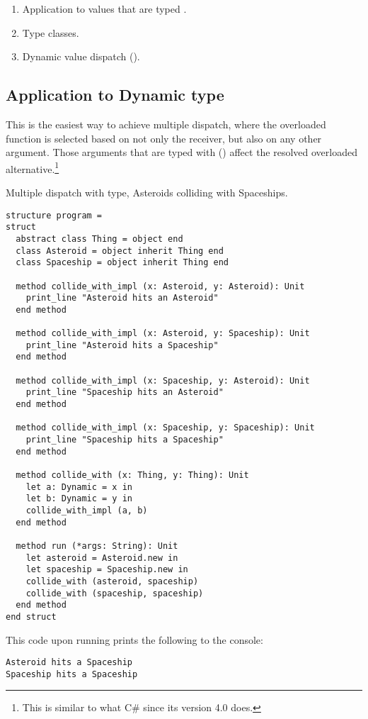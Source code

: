 \begin{enumerate}
  \item Application to values that are typed .
  \item Type classes. 
  \item Dynamic value dispatch (). 
\end{enumerate}




\subsection{Application to Dynamic type}

This is the easiest way to achieve multiple dispatch, where the overloaded function is selected based on not only the receiver, but also on any other argument. Those arguments that are typed with  () affect the resolved overloaded alternative.\footnote{This is similar to what C\# since its version 4.0 does.}

\example Multiple dispatch with  type, Asteroids colliding with Spaceships.  
\begin{lstlisting}[morekeywords={Dynamic}]
structure program =
struct
  abstract class Thing = object end
  class Asteroid = object inherit Thing end
  class Spaceship = object inherit Thing end
  
  method collide_with_impl (x: Asteroid, y: Asteroid): Unit
    print_line "Asteroid hits an Asteroid"
  end method
  
  method collide_with_impl (x: Asteroid, y: Spaceship): Unit
    print_line "Asteroid hits a Spaceship"
  end method
  
  method collide_with_impl (x: Spaceship, y: Asteroid): Unit
    print_line "Spaceship hits an Asteroid"
  end method
  
  method collide_with_impl (x: Spaceship, y: Spaceship): Unit
    print_line "Spaceship hits a Spaceship"
  end method
  
  method collide_with (x: Thing, y: Thing): Unit
    let a: Dynamic = x in
    let b: Dynamic = y in
    collide_with_impl (a, b)
  end method
  
  method run (*args: String): Unit
    let asteroid = Asteroid.new in
    let spaceship = Spaceship.new in
    collide_with (asteroid, spaceship)
    collide_with (spaceship, spaceship)
  end method
end struct
\end{lstlisting}
This code upon running  prints the following to the console:
\begin{lstlisting}
Asteroid hits a Spaceship
Spaceship hits a Spaceship
\end{lstlisting}





